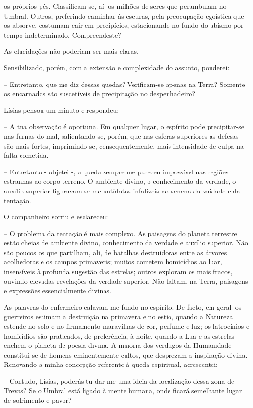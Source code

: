 \documentclass[portuguese,12pt,a4paper]{scrbook}
\begin{document}
	
	os próprios pés. Classificam-se, aí, os milhões de seres que perambulam no Umbral. Outros, preferindo caminhar às escuras, pela preocupação egoística que os absorve, costumam cair em precipícios, estacionando no fundo do abismo por tempo indeterminado. Compreendeste?
	
	As elucidações não poderiam ser mais claras.
	
	Sensibilizado, porém, com a extensão e complexidade do assunto, ponderei:
	
	– Entretanto, que me diz dessas quedas? Verificam-se apenas na Terra? Somente os encarnados são suscetíveis de precipitação no despenhadeiro?
	
	Lísias pensou um minuto e respondeu:
	
	– A tua observação é oportuna. Em qualquer lugar, o espírito pode precipitar-se nas furnas do mal, salientando-se, porém, que nas esferas superiores as defesas são mais fortes, imprimindo-se, consequentemente, mais intensidade de culpa na falta cometida.
	
	– Entretanto - objetei -, a queda sempre me pareceu impossível nas regiões estranhas ao corpo terreno. O ambiente divino, o conhecimento da verdade, o auxílio superior figuravam-se-me antídotos infalíveis ao veneno da vaidade e da tentação.
	
	O companheiro sorriu e esclareceu:
	
	– O problema da tentação é mais complexo. As paisagens do planeta terrestre estão cheias de ambiente divino, conhecimento da verdade e auxílio superior. Não são poucos os que partilham, ali, de batalhas destruidoras entre as árvores acolhedoras e os campos primaveris; muitos cometem homicídios ao luar, insensíveis à profunda sugestão das estrelas; outros exploram os mais fracos, ouvindo elevadas revelações da verdade superior. Não faltam, na Terra, paisagens e expressões essencialmente divinas.
	
	
	As palavras do enfermeiro calavam-me fundo no espírito. De facto, em geral, os guerreiros estimam a destruição na primavera e no estio, quando a Natureza estende no solo e no firmamento maravilhas de cor, perfume e luz; os latrocínios e homicídios são praticados, de preferência, à noite, quando a Lua e as estrelas enchem o planeta de poesia divina. A maioria dos verdugos da Humanidade constitui-se de homens eminentemente cultos, que desprezam a inspiração divina. Renovando a minha concepção referente à queda espiritual, acrescentei:
	
	– Contudo, Lísias, poderás tu dar-me uma ideia da localização dessa zona de Trevas? Se o Umbral está ligado à mente humana, onde ficará semelhante lugar de sofrimento e pavor?
	
\end{document}
